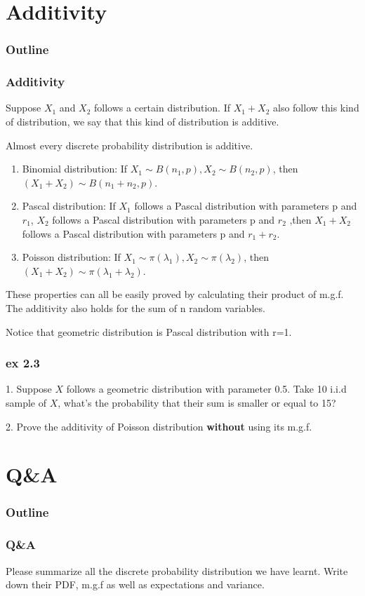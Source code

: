 \documentclass{beamer}
\begin{document}
\section{Additivity}
\begin{frame}
    \frametitle{Outline}
    \tableofcontents[currentsection]
\end{frame}
\begin{frame}
    \frametitle{Additivity}
    Suppose $X_1$ and $X_2$ follows a certain distribution. If $X_1+X_2$ also follow this kind of distribution, we say that this kind of distribution is additive.\par
    Almost every discrete probability distribution is additive.
    \begin{enumerate}
        \item Binomial distribution: If $X_1\sim B(n_1,p), X_2\sim B(n_2, p)$, then $(X_1+X_2)\sim B(n_1+n_2,p) $.
        \item Pascal distribution: If $X_1$ follows a Pascal distribution with parameters p and $r_1$, $X_2$ follows a Pascal distribution with parameters p and $r_2$ ,then $X_1+X_2$ follows a Pascal distribution with parameters p and $r_1+r_2$.
        \item Poisson distribution: If $X_1\sim \pi(\lambda_1), X_2\sim \pi(\lambda_2)$, then $(X_1+X_2)\sim \pi(\lambda_1+\lambda_2) $.
        
    \end{enumerate}
    These properties can all be easily proved by calculating their product of m.g.f. The additivity also holds for the sum of n random variables.\par
    Notice that geometric distribution is Pascal distribution with r=1.

\end{frame}

\begin{frame}
    \frametitle{ex 2.3}
    1. Suppose $X$ follows a geometric distribution with parameter 0.5. Take 10 i.i.d sample of $X$, what's the probability that their sum is smaller or equal to 15?\par
    \vspace{0.5cm}
    2. Prove the additivity of Poisson distribution \textbf{without} using its m.g.f.

\end{frame}

\section{Q\&A}
\begin{frame}
    \frametitle{Outline}
    \tableofcontents[currentsection]
\end{frame}
\begin{frame}
    \frametitle{Q\&A}
    Please summarize all the discrete probability distribution we have learnt. Write down their PDF, m.g.f as well as expectations and variance.
    

\end{frame}
\end{document}
